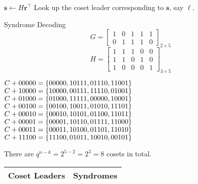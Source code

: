 \begin{algorithm}
    \DontPrintSemicolon{}
    \caption{Syndrome Decoding Algorithm}

    $ \symbf{s}\gets H\symbf{r}^\top $\;
    Look up the coset leader corresponding to $ \symbf{s} $, say $ \symbf{\ell} $.\;
\end{algorithm}


\begin{Example}{Syndrome Decoding}{}
    \[ G=\begin{bmatrix}
            1 & 0 & 1 & 1 & 1 \\
            0 & 1 & 1 & 1 & 0
        \end{bmatrix}_{2\times 5} \]
    \[ H=\begin{bmatrix}
            1 & 1 & 1 & 0 & 0 \\
            1 & 1 & 0 & 1 & 0 \\
            1 & 0 & 0 & 0 & 1
        \end{bmatrix}_{3\times 5} \]
    \begin{table}[H]
        \centering
        \caption{Table of Cosets}
        \begin{multicols}{2}
            $ C+00000=\{00000,10111,01110,11001\} $\\
            $ C+10000=\{10000,00111,11110,01001\} $\\
            $ C+01000=\{01000,11111,00000,10001\} $\\
            $ C+00100=\{00100,10011,01010,11101\} $\\
            $ C+00010=\{00010,10101,01100,11011\} $\\
            $ C+00001=\{00001,10110,01111,11000\} $\\
            $ C+00011=\{00011,10100,01101,11010\} $\\
            $ C+11100=\{11100,01011,10010,00101\} $
        \end{multicols}
    \end{table}
    There are $ q^{n-k}=2^{5-2}=2^3=8 $ cosets in total.
    \begin{table}[H]
        \centering
        \begin{tabularx}{0.5\linewidth}{@{}YY@{}}
            Coset Leaders & Syndromes \\
            \midrule

\end{tabularx}
\end{table}
\end{Example}
